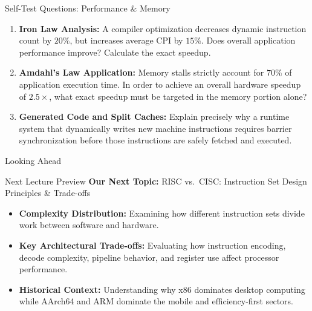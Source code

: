 \documentclass[aspectratio=169,11pt,t]{beamer}
\newcommand{\key}[1]{\textbf{#1}}
\begin{document}
\begin{frame}{Self-Test Questions: Performance \& Memory}

\begin{enumerate}\setlength{\itemsep}{6pt}

  \item \key{Iron Law Analysis:}
  A compiler optimization decreases dynamic instruction count by $20\%$,
  but increases average CPI by $15\%$.
  Does overall application performance improve?
  Calculate the exact speedup.
  \vspace{0.2cm}

  \item \key{Amdahl's Law Application:}
  Memory stalls strictly account for $70\%$ of application execution time.
  In order to achieve an overall hardware speedup of $2.5\times$, what exact speedup must be targeted in the memory portion alone?
  \vspace{0.2cm}

  \item \key{Generated Code and Split Caches:}
  Explain precisely why a runtime system that dynamically writes new machine instructions requires barrier synchronization before those instructions are safely fetched and executed.

\end{enumerate}

\vfill
\end{frame}






\begin{frame}{Looking Ahead}

\begin{block}{Next Lecture Preview}
\key{Our Next Topic:}
RISC vs.\ CISC: Instruction Set Design Principles \& Trade-offs
\end{block}

\vfill

\begin{itemize}\setlength{\itemsep}{7pt}
  \item \key{Complexity Distribution:}
  Examining how different instruction sets divide work between software and hardware.
  \item \key{Key Architectural Trade-offs:}
  Evaluating how instruction encoding, decode complexity, pipeline behavior, and register use affect processor performance.
  \item \key{Historical Context:}
  Understanding why x86 dominates desktop computing while AArch64 and ARM dominate the mobile and efficiency-first sectors.
\end{itemize}

\vfill
\end{frame}
\end{document}
